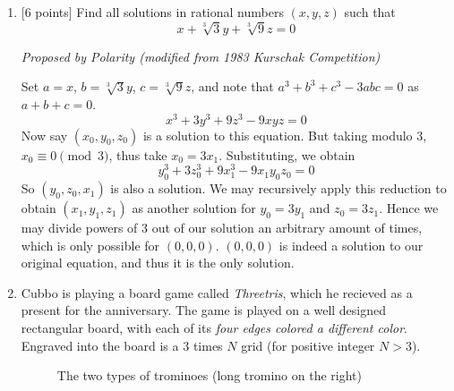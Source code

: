 \begin{enumerate}[align=left,start=1,label=\textbf{\textcolor{meablue}{Problem \arabic*}}]
\begin{solution}
    \end{solution}
    \item {[$6$ points]} Find all solutions in rational numbers $(x, y, z)$ such that
        \[x + \sqrt[3]{3}y + \sqrt[3]{9}z = 0\]

    \textrm{\emph{Proposed by Polarity (modified from 1983 Kurschak Competition)}}

    \begin{solution}
        Set $a = x$, $b = \sqrt[3]{3}y$, $c = \sqrt[3]{9}z$, and note that $a^3 + b^3 + c^3 - 3abc = 0$ as $a + b + c = 0$. 
        \[x^3 + 3y^3 + 9z^3 - 9xyz = 0\]
        Now say $(x_0, y_0, z_0)$ is a solution to this equation. But taking modulo 3, $x_0 \equiv 0 \pmod{3}$, thus take $x_0 = 3x_1$. Substituting, we obtain 
        \[y_0^3 + 3z_0^3 + 9x_1^3 - 9x_1y_0z_0 = 0\]
        So $(y_0, z_0, x_1)$ is also a solution. We may recursively apply this reduction to obtain $(x_1, y_1, z_1)$ as another solution for $y_0 = 3y_1$ and $z_0 = 3z_1$. Hence we may divide powers of 3 out of our solution an arbitrary amount of times, which is only possible for $(0, 0, 0)$. $(0, 0, 0)$ is indeed a solution to our original equation, and thus it is the only solution.
    \end{solution}
    \item 
        Cubbo is playing a board game called \emph{Threetris}, which he recieved as a present for the anniversary. The game is played on a well designed rectangular board, with each of its \emph{four edges colored a different color}. Engraved into the board is a 3 times $N$ grid (for positive integer $N > 3$).
        \begin{figure}[!ht]
            \centering
            \caption{The two types of trominoes (long tromino on the right)}
        \end{figure}
        

\end{enumerate}
